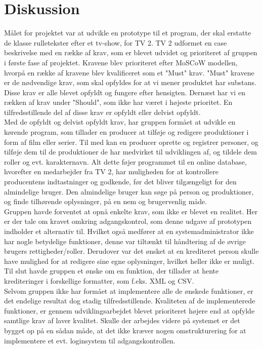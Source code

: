 \section{Diskussion}

Målet for projektet var at udvikle en prototype til et program, der skal erstatte de klasse rulletekster efter et tv-show, for TV 2. TV 2 udformet en case beskrivelse med en række af krav, som er blevet udvidet og prioriteret af gruppen i første fase af projektet. Kravene blev prioriteret efter MoSCoW modellen, hvorpå en række af kravene blev kvalificeret som et "Must" krav. "Must" kravene er de nødvendige krav, som skal opfyldes for at vi mener produktet har substans. Disse krav er alle blevet opfyldt og fungere efter hensigten. Dernæst har vi en rækken af krav under "Should", som ikke har været i højeste prioritet. En tilfredsstillende del af disse krav er opfyldt eller delvist opfyldt. \\
Med de opfyldt og delvist opfyldt krav, har gruppen formået at udvikle en kørende program, som tillader en producer at tilføje og redigere produktioner i form af film eller serier. Til med kan en producer oprette og registrer personer, og tilføje dem til de produktioner de har medvirket til udviklingen af, og tildele dem roller og evt. karakternavn. Alt dette føjer programmet til en online database, hvorefter en medarbejder fra TV 2, har muligheden for at kontrollere producentens indtastninger og godkende, før det bliver tilgængeligt for den almindelige bruger. Den almindelige bruger kan søge på person og produktioner, og finde tilhørende oplysninger, på en nem og brugervenlig måde. \\
Gruppen havde forventet at opnå enkelte krav, som ikke er blevet en realitet. Her er der tale om kravet omkring adgangskontrol, som denne udgave af prototypen indholder et alternativ til. Hvilket også medfører at en systemadministrator ikke har nogle betydelige funktioner, denne var tiltænkt til håndtering af de øvrige brugers rettigheder/roller. Derudover var det ønsket at en krediteret person skulle have mulighed for at redigere sine egne oplysninger, hvilket heller ikke er muligt. Til slut havde gruppen et ønske om en funktion, der tillader at hente krediteringer i forskellige formatter, som f.eks. XML og CSV. \\
Selvom gruppen ikke har formået at implementere alle de ønskede funktioner, er det endelige resultat dog stadig tilfredsstillende. Kvaliteten af de implementerede funktioner, er gennem udviklingsarbejdet blevet prioriteret højere end at opfylde samtlige krav af laver kvalitet. Skulle der arbejdes videre på systemet er det bygget op på en sådan måde, at det ikke kræver nogen omstrukturering for at implementere et evt. loginsystem til adgangskontrollen.  

